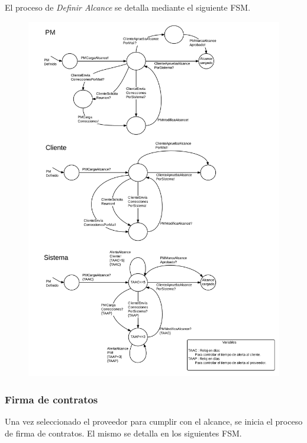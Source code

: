 El proceso de \textit{Definir Alcance} se detalla mediante el siguiente FSM. 
\begin{figure}[H]
\includegraphics[width=\linewidth]{diag/nuevos/fsm-alcance.png}
\label{fsm-alcance}
\end{figure}

		\subsubsection{Firma de contratos}
Una vez seleccionado el proveedor para cumplir con el alcance, se inicia 
el proceso de firma de contratos. El mismo se detalla en los siguientes FSM. 

